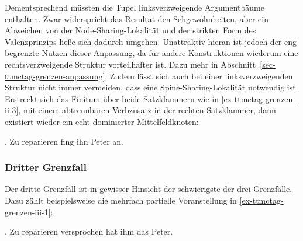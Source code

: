 Dementsprechend müssten die Tupel linksverzweigende Argumentbäume enthalten. Zwar widerspricht das Resultat den Sehgewohnheiten, aber ein Abweichen von der Node-Sharing-Lokalität und der strikten Form des Valenzprinzips lie\ss e sich dadurch umgehen. Unattraktiv hieran ist jedoch der eng begrenzte Nutzen dieser Anpassung, da für andere Konstruktionen wiederum eine rechtsverzweigende Struktur vorteilhafter ist. Dazu mehr in Abschnitt~\ref{sec-ttmctag-grenzen-anpassung}. Zudem lässt sich auch bei einer linksverzweigenden Struktur nicht immer vermeiden, dass eine Spine-Sharing-Lokalität notwendig ist. Erstreckt sich das Finitum über beide Satzklammern wie in \ref{ex-ttmctag-grenzen-ii-3}, mit einem abtrennbaren Verbzusatz in der rechten Satzklammer, dann existiert wieder ein echt-dominierter Mittelfeldknoten:   

\ex. Zu reparieren fing ihn Peter an. \label{ex-ttmctag-grenzen-ii-3}  


\subsubsection{Dritter Grenzfall}

Der dritte Grenzfall ist in gewisser Hinsicht der schwierigste der drei Grenzfälle. Dazu zählt beispielsweise die mehrfach partielle Voranstellung in \ref{ex-ttmctag-grenzen-iii-1}: 

\ex. Zu reparieren versprochen hat ihm das Peter. \label{ex-ttmctag-grenzen-iii-1}

